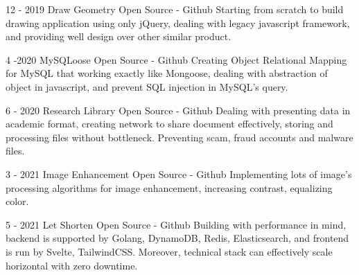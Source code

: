 \documentclass[10pt,A4]{article}
\begin{document}
\begin{paracol}{2}
\begin{rightcolumn}
\cvevent
	{12 - 2019}
	{Draw Geometry}
	{Open Source - Github}
	{Starting from scratch to build drawing application using only jQuery, dealing with legacy javascript framework, and providing well design over other similar product.}
	
\cvevent
	{4 -2020}
	{MySQLoose}
	{Open Source - Github}
	{Creating Object Relational Mapping for MySQL that working exactly like Mongoose, dealing with abstraction of object in javascript, and prevent SQL injection in MySQL's query.}
	
\cvevent
	{6 - 2020}
	{Research Library}
	{Open Source - Github}
	{Dealing with presenting data in academic format, creating network to share document effectively, storing and processing files without bottleneck. Preventing scam, fraud accounts and malware files.}
	
\cvevent
	{3 - 2021}
	{Image Enhancement}
	{Open Source - Github}
	{Implementing lots of image's processing algorithms for image enhancement, increasing contrast, equalizing color.}
	
\cvevent
	{5 - 2021}
	{Let Shorten}
	{Open Source - Github}
	{Building with performance in mind, backend is supported by Golang, DynamoDB, Redis, Elasticsearch, and frontend is run by Svelte, TailwindCSS. Moreover, technical stack can effectively scale horizontal with zero downtime.}


\end{rightcolumn}
\end{paracol}
\end{document}
